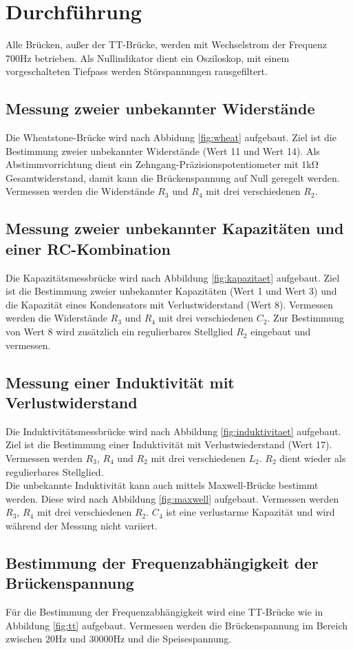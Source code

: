 \newpage
\section{Durchführung}
\label{sec:Durchführung}
Alle Brücken, außer der TT-Brücke, werden mit Wechselstrom der Frequenz $700\si{\hertz}$ betrieben.
Als Nullindikator dient ein Osziloskop, mit einem vorgeschalteten Tiefpass werden Störspannungen rausgefiltert.
\subsection{Messung zweier unbekannter Widerstände}
Die Wheatstone-Brücke wird nach Abbidung \ref{fig:wheat} aufgebaut. Ziel ist die Bestimmung zweier unbekannter Widerstände (Wert 11 und Wert 14).
Als Abstimmvorrichtung dient ein Zehngang-Präzisionspotentiometer mit $1\si{\kilo\ohm}$ Gesamtwiderstand, damit kann die Brückenspannung auf Null geregelt werden.
Vermessen werden die Widerstände $R_\mathrm{3}$ und $R_\mathrm{4}$ mit drei verschiedenen $R_\mathrm{2}$.
\subsection{Messung zweier unbekannter Kapazitäten und einer RC-Kombination}
Die Kapazitätsmessbrücke wird nach Abbildung \ref{fig:kapazitaet} aufgebaut.
Ziel ist die Bestimmung zweier unbekannter Kapazitäten (Wert 1 und Wert 3) und die Kapazität eines Kondensators mit Verlustwiderstand (Wert 8).
Vermessen werden die Widerstände $R_\mathrm{3}$ und $R_\mathrm{4}$ mit drei verschiedenen $C_\mathrm{2}$.
Zur Bestimmung von Wert 8 wird zusätzlich ein regulierbares Stellglied $R_\mathrm{2}$ eingebaut und vermessen.
\subsection{Messung einer Induktivität mit Verlustwiderstand}
Die Induktivitätsmessbrücke wird nach Abbildung \ref{fig:induktivitaet} aufgebaut.
Ziel ist die Bestimmung einer Induktivität mit Verlustwiederstand (Wert 17).
Vermessen werden $R_\mathrm{3}$, $R_\mathrm{4}$ und $R_\mathrm{2}$ mit drei verschiedenen $L_\mathrm{2}$.
$R_\mathrm{2}$ dient wieder als regulierbares Stellglied.\\
Die unbekannte Induktivität kann auch mittels Maxwell-Brücke bestimmt werden.
Diese wird nach Abbildung \ref{fig:maxwell} aufgebaut.
Vermessen werden $R_\mathrm{3}$, $R_\mathrm{4}$ mit drei verschiedenen $R_\mathrm{2}$.
$C_\mathrm{4}$ ist eine verlustarme Kapazität und wird während der Messung nicht variiert.
\subsection{Bestimmung der Frequenzabhängigkeit der Brückenspannung}
Für die Bestimmung der Frequenzabhängigkeit wird eine TT-Brücke wie in Abbildung \ref{fig:tt}
aufgebaut. Vermessen werden die Brückenspannung im Bereich zwischen $20\si{\hertz}$ und $30000\si{\hertz}$ und die Speisespannung.
\newpage
